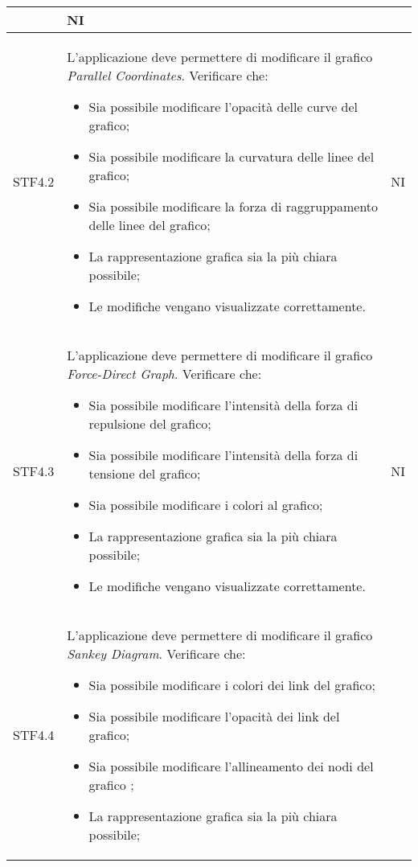 \begin{center}
\begin{longtable}{|p{1.5cm}|p{11cm}|p{1cm}|}
\begin{itemize}
        \end{itemize} & NI\\ \hline
        \rowcolor[HTML]{EFEFEF}
        STF4.2 & L'applicazione deve permettere di modificare il grafico \textit{Parallel Coordinates}. Verificare che: \begin{itemize}
            \item Sia possibile modificare l'opacità delle curve del grafico;
            \item Sia possibile modificare la curvatura delle linee del grafico;
            \item Sia possibile modificare la forza di raggruppamento delle linee del grafico;
            \item La rappresentazione grafica sia la più chiara possibile;
            \item Le modifiche vengano visualizzate correttamente.
        \end{itemize} & NI\\ \hline
        \rowcolor[HTML]{C0C0C0}
        STF4.3 & L'applicazione deve permettere di modificare il grafico \textit{Force-Direct Graph}. Verificare che: \begin{itemize}
            \item Sia possibile modificare l'intensità della forza di repulsione del grafico;
            \item Sia possibile modificare l'intensità della forza di tensione del grafico;
            \item Sia possibile modificare i colori al grafico;
            \item La rappresentazione grafica sia la più chiara possibile;
            \item Le modifiche vengano visualizzate correttamente.
        \end{itemize} & NI\\ \hline
        \rowcolor[HTML]{EFEFEF}
        STF4.4 & L'applicazione deve permettere di modificare il grafico \textit{Sankey Diagram}. Verificare che: \begin{itemize}
            \item Sia possibile modificare i colori dei link del grafico;
            \item Sia possibile modificare l'opacità dei link del grafico;
            \item Sia possibile modificare l'allineamento dei nodi del grafico ;
            \item La rappresentazione grafica sia la più chiara possibile;    

\end{itemize}
\end{longtable}
\end{center}
